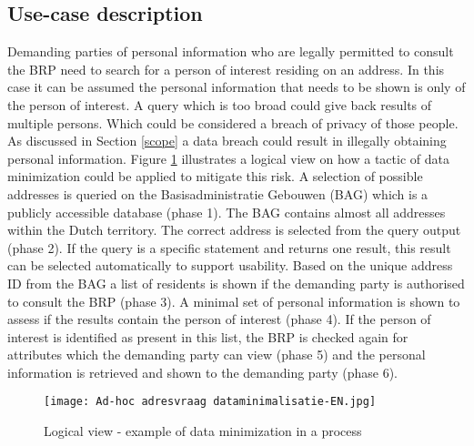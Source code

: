 \subsection{Use-case description}
Demanding parties of personal information who are legally permitted to consult the BRP need to search for a person of interest residing on an address. In this case it can be assumed the personal information that needs to be shown is only of the person of interest. A query which is too broad could give back results of multiple persons. Which could be considered a breach of privacy of those people. As discussed in Section \ref{scope} a data breach could result in illegally obtaining personal information. Figure \ref{fig:Adhoc} illustrates a logical view on how a tactic of data minimization could be applied to mitigate this risk. A selection of possible addresses is queried on the Basisadministratie Gebouwen (BAG) \cite{BAG} which is a publicly accessible database (phase 1). The BAG contains almost all addresses within the Dutch territory. The correct address is selected from the query output (phase 2). If the query is a specific statement and returns one result, this result can be selected automatically to support usability. Based on the unique address ID from the BAG a list of residents is shown if the demanding party is authorised to consult the BRP (phase 3). A minimal set of personal information is shown to assess if the results contain the person of interest (phase 4). If the person of interest is identified as present in this list, the BRP is checked again for attributes which the demanding party can view (phase 5) and the personal information is retrieved and shown to the demanding party (phase 6).
    
    \begin{figure}
        \graphicspath{ {./images/} }
        \centering
        \texttt{[image: Ad-hoc adresvraag dataminimalisatie-EN.jpg]}\\
        \caption{Logical view - example of data minimization in a process}
        \label{fig:Adhoc}
    \end{figure}


